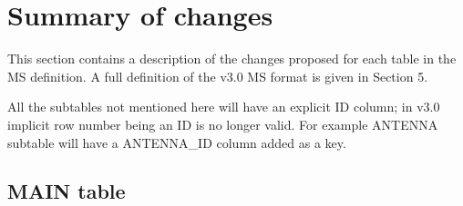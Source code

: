 \documentclass{article}
\begin{document}
\section{Summary of changes}

This section contains a description of the changes proposed for each
table in the MS definition. A full definition of the v3.0 MS format is
given in Section 5.

All the subtables not mentioned here will have an explicit ID column;
in v3.0 implicit row number being an ID is no longer valid. For
example ANTENNA subtable will have a ANTENNA\_ID column added as a key.

\subsection{MAIN table}
\end{document}
